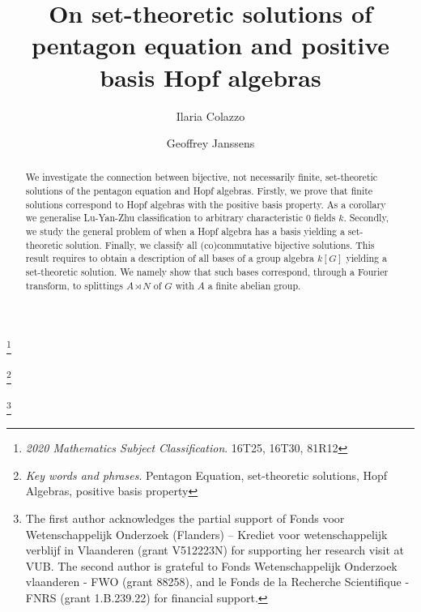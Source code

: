 \documentclass[a4paper,10pt]{amsart}
\theoremstyle{definition}
\theoremstyle{remark}
\begin{document}
\title[On combinatorial solutions of PE and positive basis Hopf algebras]{On set-theoretic solutions of pentagon equation and positive basis Hopf algebras}
\author{Ilaria Colazzo}
\author{Geoffrey Janssens}

\address{(Ilaria Colazzo)\newline University of Leeds
School of Mathematics
Department of Pure Mathematics
Leeds, UK
\newline E-mail address: {\tt I.Colazzo@leeds.ac.uk}\newline
(Geoffrey Janssens) \newline Departement Wiskunde, Vrije Universiteit Brussel,
Pleinlaan $2$, 1050 Elsene, Belgium \newline E-mail address: {\tt geofjans@vub.ac.be}}




\begin{abstract}
We investigate the connection between bijective, not necessarily finite, set-theoretic solutions of the pentagon equation and Hopf algebras. Firstly, we prove that finite solutions correspond to Hopf algebras with the positive basis property. As a corollary we generalise Lu-Yan-Zhu classification to arbitrary characteristic $0$ fields $k$. 
Secondly, we study the general problem of when a Hopf algebra has a basis yielding a set-theoretic solution. Finally, we classify all (co)commutative bijective solutions. This result requires to obtain a description of all bases of a group algebra $k[G]$ yielding a set-theoretic solution. We namely show   that such bases correspond, through a Fourier transform, to splittings $A \rtimes N$ of $G$ with $A$ a finite abelian group.
\end{abstract}
\maketitle

\newcommand\blfootnote[1]{%
  \begingroup
  \renewcommand\thefootnote{}\footnote{#1}%
  \addtocounter{footnote}{-1}%
  \endgroup
}

\blfootnote{\textit{2020 Mathematics Subject Classification}. 16T25, 16T30, 81R12 }
\blfootnote{\textit{Key words and phrases}. Pentagon Equation, set-theoretic solutions, Hopf Algebras, positive basis property} 

\blfootnote{The first author acknowledges the partial support of Fonds voor Wetenschappelijk
Onderzoek (Flanders) – Krediet voor wetenschappelijk verblijf in Vlaanderen (grant
V512223N) for supporting her research visit at VUB. The second author is grateful to Fonds Wetenschappelijk Onderzoek vlaanderen - FWO (grant 88258), and le Fonds de la Recherche Scientifique - FNRS (grant 1.B.239.22) for financial support.}
\end{document}
